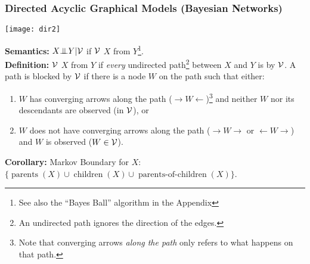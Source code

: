 \begin{frame}
\frametitle{Directed Acyclic Graphical Models (Bayesian Networks) }




\vspace*{-1ex} 
\hspace*{3in} \texttt{[image: dir2]}

\vspace*{-3ex} 
{\bf Semantics:} $X{\bot\negthickspace\negthickspace\bot} Y|{\cal V}$ if ${\cal V}$  $X$
from $Y$\footnote{See also the ``Bayes Ball'' algorithm in the Appendix}.\\

{\bf Definition:} ${\cal V}$  $X$ from $Y$ if {\em every} undirected
path\footnote{An undirected path ignores the direction of the edges.}
between $X$ and $Y$ is  by ${\cal V}$. A path is blocked
by ${\cal V}$ if 
there is a node $W$ on the path such that either: 
%
\begin{enumerate}
\item $W$ has converging arrows along
the path ($\rightarrow W 
\leftarrow$)\footnote{Note that converging arrows {\em along the path}
only refers to what happens on that path.} and neither $W$ nor its
descendants are observed (in ${\cal V}$), or 
\item $W$ does not have converging arrows along the path ($\rightarrow W
\rightarrow$ or $\leftarrow W
\rightarrow$) and $W$ is observed ($W\in {\cal V}$).
\end{enumerate}

\vspace{1ex}

{\bf Corollary:} Markov Boundary for $X$: $\{\operatorname{parents}(X)\cup\operatorname{children}(X)\cup\operatorname{parents-of-children}(X)\}$.

\end{frame}
